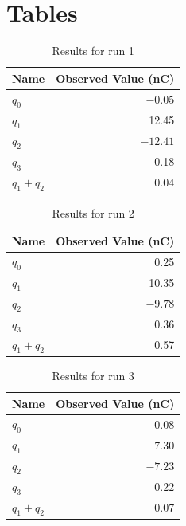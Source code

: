 \section{Tables}
\begin{table}[ht]
	\centering
	\begin{tabular}{|l|r|}
		\hline
		Name & Observed Value (nC) \\
		\hline
		$q_{0}$ & $-0.05$ \\
		$q_{1}$ & 12.45 \\
		$q_{2}$ & $-12.41$ \\
		$q_{3}$ & 0.18 \\
		$q_{1} + q_{2}$ & 0.04 \\
		\hline
	\end{tabular}
	\caption{Results for run 1}
	\label{table_01_run_1}
\end{table}
\begin{table}[ht]
	\centering
	\begin{tabular}{|l|r|}
		\hline
		Name & Observed Value (nC) \\
		\hline
		$q_{0}$ & 0.25 \\
		$q_{1}$ & 10.35 \\
		$q_{2}$ & $-9.78$ \\
		$q_{3}$ & 0.36 \\
		$q_{1} + q_{2}$ & 0.57 \\
		\hline
	\end{tabular}
	\caption{Results for run 2}
	\label{table_01_run_2}
\end{table}
\begin{table}[ht]
	\centering
	\begin{tabular}{|l|r|}
		\hline
		Name & Observed Value (nC) \\
		\hline
		$q_{0}$ & 0.08 \\
		$q_{1}$ & 7.30 \\
		$q_{2}$ & $-7.23$ \\
		$q_{3}$ & 0.22 \\
		$q_{1} + q_{2}$ & 0.07 \\
		\hline
	\end{tabular}
	\caption{Results for run 3}
	\label{table_01_run_3}
\end{table}

